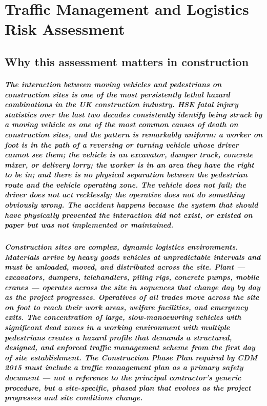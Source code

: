 \chapter{Traffic Management and Logistics Risk Assessment}
\label{chap:Traffic Management and Logistics Risk Assessment}

\section{Why this assessment matters in construction}

\paragraph{The interaction between moving vehicles and pedestrians on construction sites is one of the most persistently lethal hazard combinations in the UK construction industry. HSE fatal injury statistics over the last two decades consistently identify being struck by a moving vehicle as one of the most common causes of death on construction sites, and the pattern is remarkably uniform: a worker on foot is in the path of a reversing or turning vehicle whose driver cannot see them; the vehicle is an excavator, dumper truck, concrete mixer, or delivery lorry; the worker is in an area they have the right to be in; and there is no physical separation between the pedestrian route and the vehicle operating zone. The vehicle does not fail; the driver does not act recklessly; the operative does not do something obviously wrong. The accident happens because the system that should have physically prevented the interaction did not exist, or existed on paper but was not implemented or maintained.}

\paragraph{Construction sites are complex, dynamic logistics environments. Materials arrive by heavy goods vehicles at unpredictable intervals and must be unloaded, moved, and distributed across the site. Plant --- excavators, dumpers, telehandlers, piling rigs, concrete pumps, mobile cranes --- operates across the site in sequences that change day by day as the project progresses. Operatives of all trades move across the site on foot to reach their work areas, welfare facilities, and emergency exits. The concentration of large, slow-manoeuvring vehicles with significant dead zones in a working environment with multiple pedestrians creates a hazard profile that demands a structured, designed, and enforced traffic management scheme from the first day of site establishment. The Construction Phase Plan required by CDM 2015 must include a traffic management plan as a primary safety document --- not a reference to the principal contractor's generic procedure, but a site-specific, phased plan that evolves as the project progresses and site conditions change.}

